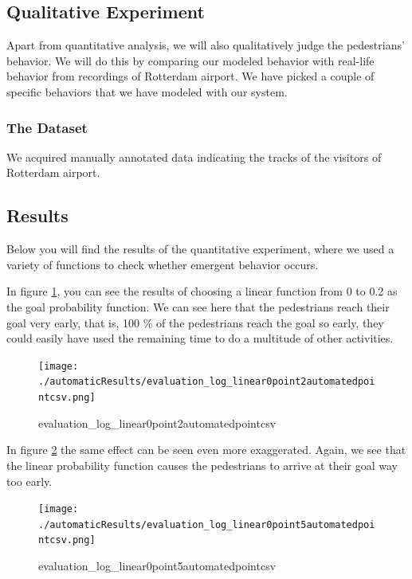 \documentclass[11pt]{book}
\begin{document}
\subsection{Qualitative Experiment}
Apart from quantitative analysis, we will also qualitatively judge the pedestrians' behavior. We will do this by comparing our modeled behavior with real-life behavior from recordings of Rotterdam airport. We have picked a couple of specific behaviors that we have modeled with our system.

\subsubsection{The Dataset}
We acquired manually annotated data indicating the tracks of the visitors of Rotterdam airport. 


\subsection{Results}
Below you will find the results of the quantitative experiment, where we used a variety of functions to check whether emergent behavior occurs.

In figure \ref{evaluation_log_linear0point2automatedpointcsv}, you can see the results of choosing a linear function from 0 to 0.2 as the goal probability function. We can see here that the pedestrians reach their goal very early, that is, 100 \% of the pedestrians reach the goal so early, they could easily have used the remaining time to do a multitude of other activities.

\begin{figure}
\centering
\texttt{[image: ./automaticResults/evaluation\_log\_linear0point2automatedpointcsv.png]}
\caption{evaluation\_log\_linear0point2automatedpointcsv}
\label{evaluation_log_linear0point2automatedpointcsv}
\end{figure}

In figure \ref{evaluation_log_linear0point5automatedpointcsv} the same effect can be seen even more exaggerated. Again, we see that the linear probability function causes the pedestrians to arrive at their goal way too early.

\begin{figure}
\centering
\texttt{[image: ./automaticResults/evaluation\_log\_linear0point5automatedpointcsv.png]}
\caption{evaluation\_log\_linear0point5automatedpointcsv}
\label{evaluation_log_linear0point5automatedpointcsv}
\end{figure}
\end{document}
